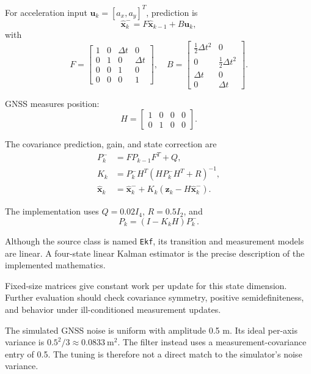 \documentclass[conference]{IEEEtran}
\begin{document}
For acceleration input
$\mathbf{u}_k=[a_x,a_y]^T$, prediction is
\begin{equation}
\hat{\mathbf{x}}^-_k =
F\hat{\mathbf{x}}_{k-1}+B\mathbf{u}_k,
\end{equation}
with
\begin{equation}
F =
\begin{bmatrix}
1&0&\Delta t&0\\
0&1&0&\Delta t\\
0&0&1&0\\
0&0&0&1
\end{bmatrix},
\quad
B =
\begin{bmatrix}
\frac{1}{2}\Delta t^2&0\\
0&\frac{1}{2}\Delta t^2\\
\Delta t&0\\
0&\Delta t
\end{bmatrix}.
\end{equation}

GNSS measures position:
\begin{equation}
H =
\begin{bmatrix}
1&0&0&0\\
0&1&0&0
\end{bmatrix}.
\end{equation}

The covariance prediction, gain, and state correction are
\begin{align}
P^-_k &= FP_{k-1}F^T+Q,\\
K_k &= P^-_kH^T(HP^-_kH^T+R)^{-1},\\
\hat{\mathbf{x}}_k &=
\hat{\mathbf{x}}^-_k+
K_k(\mathbf{z}_k-H\hat{\mathbf{x}}^-_k).
\end{align}

The implementation uses $Q=0.02I_4$, $R=0.5I_2$, and
\begin{equation}
P_k=(I-K_kH)P^-_k.
\end{equation}

Although the source class is named \texttt{Ekf}, its
transition and measurement models are linear.
A four-state linear Kalman estimator is the precise
description of the implemented mathematics.

Fixed-size matrices give constant work per update for this
state dimension. Further evaluation should check covariance
symmetry, positive semidefiniteness, and behavior under
ill-conditioned measurement updates.

The simulated GNSS noise is uniform with amplitude 0.5 m.
Its ideal per-axis variance is
$0.5^2/3\approx0.0833\ \mathrm{m}^2$.
The filter instead uses a measurement-covariance entry of
0.5. The tuning is therefore not a direct match to the
simulator's noise variance.
\end{document}
